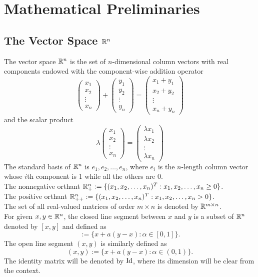 \documentclass[10pt,a4paper]{article}
\begin{document}
\section{Mathematical Preliminaries}

\subsection{The Vector Space $\mathbb{R}^n$}
The vector space $\mathbb{R}^n$  is the set of $n$-dimensional column vectors with real components endowed with the component-wise addition operator
\begin{equation*}
	\begin{pmatrix}
		x_1\\
		x_2\\
		\vdots\\
		x_n
	\end{pmatrix}
+
\begin{pmatrix}
	y_1\\
	y_2\\
	\vdots\\
	y_n
\end{pmatrix}
= 
\begin{pmatrix}
	x_1+y_1\\
	x_2+y_2\\
	\vdots\\
	x_n + y_n
\end{pmatrix}
\end{equation*}
and the scalar product
\begin{equation*}
	\lambda \begin{pmatrix}
		x_1\\
		x_2\\
		\vdots\\
		x_n
	\end{pmatrix}
= 
\begin{pmatrix}
	\lambda x_1\\
	\lambda x_2\\
	\vdots\\
	\lambda x_n
\end{pmatrix}
\end{equation*}
The standard basis of $\mathbb{R}^n$ is $e_1, e_2, \dots, e_n$, where $e_i$ is the $n$-length column vector whose $i$th component is 1 while all the others are 0.\\
The nonnegative orthant $\mathbb{R}^n_+:=\{(x_1,x_2, \dots, x_n)^T: x_1, x_2,\dots,x_n\geq 0\}$.\\
The positive orthant $\mathbb{R}^n_{++}:=\{(x_1,x_2, \dots, x_n)^T: x_1, x_2,\dots,x_n> 0\}$.\\
The set of all real-valued matrices of order $m \times n$ is denoted by $\mathbb{R}^{m\times n}$.\\
For given $x, y \in \mathbb{R}^n$, the closed line segment between $x$ and $y$ is a subset of $\mathbb{R}^n$ denoted by $[x, y]$ and defined as 
\begin{equation*}
	[x,y]:= \{x+a(y-x): \alpha \in[0,1]\}.
\end{equation*}
The open line segment $(x,y)$ is similarly defined as  
\begin{equation*}
	(x,y):= \{x+a(y-x): \alpha \in(0,1)\}.
\end{equation*}
The identity matrix will be denoted by $\mathord{\mathrm{Id}}$, where its dimension will be clear from the context.
\end{document}
